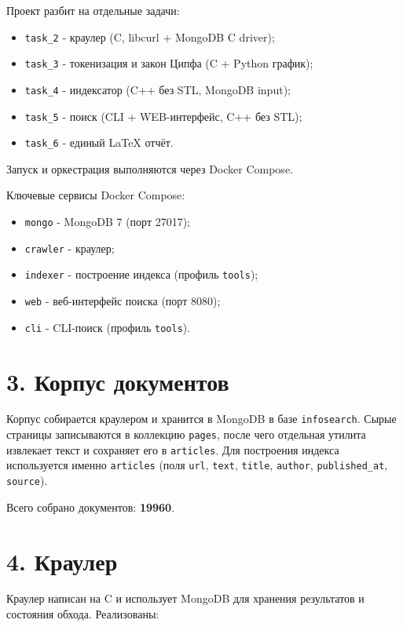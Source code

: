 ﻿\documentclass[12pt,a4paper]{article}
\begin{document}
Проект разбит на отдельные задачи:

\begin{itemize}[label=•, leftmargin=1.2em]
\item \texttt{task\_2} - краулер (C, libcurl + MongoDB C driver);
\item \texttt{task\_3} - токенизация и закон Ципфа (C + Python график);
\item \texttt{task\_4} - индексатор (C++ без STL, MongoDB input);
\item \texttt{task\_5} - поиск (CLI + WEB-интерфейс, C++ без STL);
\item \texttt{task\_6} - единый LaTeX отчёт.
\end{itemize}

Запуск и оркестрация выполняются через Docker Compose.

Ключевые сервисы Docker Compose:

\begin{itemize}[label=•, leftmargin=1.2em]
\item \texttt{mongo} - MongoDB 7 (порт 27017);
\item \texttt{crawler} - краулер;
\item \texttt{indexer} - построение индекса (профиль \texttt{tools});
\item \texttt{web} - веб-интерфейс поиска (порт 8080);
\item \texttt{cli} - CLI-поиск (профиль \texttt{tools}).
\end{itemize}

\section*{3. Корпус документов}

Корпус собирается краулером и хранится в MongoDB в базе \texttt{infosearch}. Сырые страницы записываются в коллекцию \texttt{pages}, после чего отдельная утилита извлекает текст и сохраняет его в \texttt{articles}. Для построения индекса используется именно \texttt{articles} (поля \texttt{url}, \texttt{text}, \texttt{title}, \texttt{author}, \texttt{published\_at}, \texttt{source}).

Всего собрано документов: \textbf{19960}.

\section*{4. Краулер}

Краулер написан на C и использует MongoDB для хранения результатов и состояния обхода. Реализованы:
\end{document}
